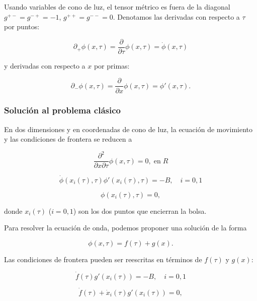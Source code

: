 Usando variables de cono de luz, el tensor métrico es fuera de la diagonal ${g}^{+-} = {g}^{-+} = -1$, ${g}^{++} ={g}^{--} = 0$. Denotamos las derivadas con respecto a $\tau$ por puntos:

\[
{\partial}_{+} {\phi} (x, \tau) = \frac{\partial}{\partial \tau} {\phi} (x, \tau) = \dot{\phi} (x,\tau)
\]

y derivadas con respecto a $x$ por primas:

\[
{\partial}_{-} {\phi} (x, \tau) = \frac{\partial}{\partial x} \phi (x, \tau) = {\phi}' (x, \tau).
\]

\subsubsection{Solución al problema clásico}

En dos dimensiones y en coordenadas de cono de luz, la ecuación de movimiento y las condiciones de frontera se reducen a

\begin{equation}
\frac{{\partial}^{2}}{\partial x \partial \tau} {\phi} (x, \tau) = 0, \; \mathrm{en} \; R
\end{equation}

\begin{equation}
\dot{\phi} ({x}_{i} (\tau), \tau) {\phi}' ({x}_{i}(\tau), \tau) = - B, \quad i =0,1
\end{equation}

\begin{equation}
{\phi}({x}_{i}(\tau), \tau) = 0,
\end{equation}

donde ${x}_{i} (\tau)$ ($i = 0, 1$) son los dos puntos que encierran la bolsa. 

Para resolver la ecuación de onda, podemos proponer una solución de la forma

\begin{equation}
{\phi}(x, \tau) = {f}(\tau) + g(x).
\end{equation}

Las condiciones de frontera pueden ser reescritas en términos de ${f}(\tau)$ y ${g}(x)$:

\begin{equation}
\dot{f} (\tau) {g}' ({x}_{i}(\tau)) = - B, \quad i=0, 1
\end{equation}

\begin{equation}
\dot{f}(\tau) + \dot{x}_{i} (\tau) {g}' ({x}_{i} (\tau)) = 0,
\end{equation}

